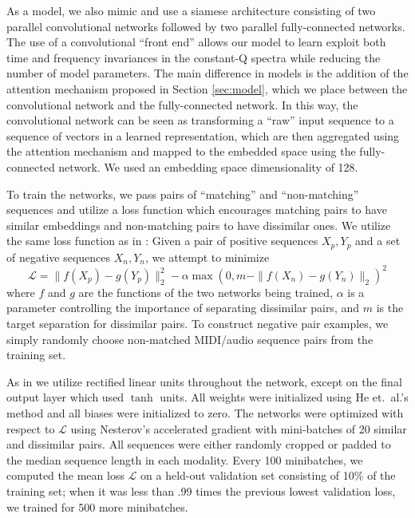 \documentclass{article}
\begin{document}
As a model, we also mimic \cite{raffel2015large} and use a siamese architecture consisting of two parallel convolutional networks followed by two parallel fully-connected networks.
The use of a convolutional ``front end'' allows our model to learn exploit both time and frequency invariances in the constant-Q spectra while reducing the number of model parameters.
The main difference in models is the addition of the attention mechanism proposed in Section \ref{sec:model}, which we place between the convolutional network and the fully-connected network.
In this way, the convolutional network can be seen as transforming a ``raw'' input sequence to a sequence of vectors in a learned representation, which are then aggregated using the attention mechanism and mapped to the embedded space using the fully-connected network.
We used an embedding space dimensionality of 128.

To train the networks, we pass pairs of ``matching'' and ``non-matching'' sequences and utilize a loss function which encourages matching pairs to have similar embeddings and non-matching pairs to have dissimilar ones.
We utilize the same loss function as in \cite{raffel2015large}: Given a pair of positive sequences $X_p, Y_p$ and a set of negative sequences $X_n, Y_n$, we attempt to minimize
$$
\mathcal{L} = \|f(X_p) - g(Y_p)\|_2^2 - \alpha \max(0, m - \|f(X_n) - g(Y_n)\|_2)^2
$$
where $f$ and $g$ are the functions of the two networks being trained, $\alpha$ is a parameter controlling the importance of separating dissimilar pairs, and $m$ is the target separation for dissimilar pairs.
To construct negative pair examples, we simply randomly choose non-matched MIDI/audio sequence pairs from the training set.

As in \cite{raffel2015large} we utilize rectified linear units throughout the network, except on the final output layer which used $\tanh$ units.
All weights were initialized using He et.\ al.'s method \cite{he2015delving} and all biases were initialized to zero.
The networks were optimized with respect to $\mathcal{L}$ using Nesterov's accelerated gradient \cite{sutskever2013importance} with mini-batches of 20 similar and dissimilar pairs.
All sequences were either randomly cropped or padded to the median sequence length in each modality.
Every 100 minibatches, we computed the mean loss $\mathcal{L}$ on a held-out validation set consisting of 10\% of the training set; when it was less than .99 times the previous lowest validation loss, we trained for 500 more minibatches.
\end{document}
